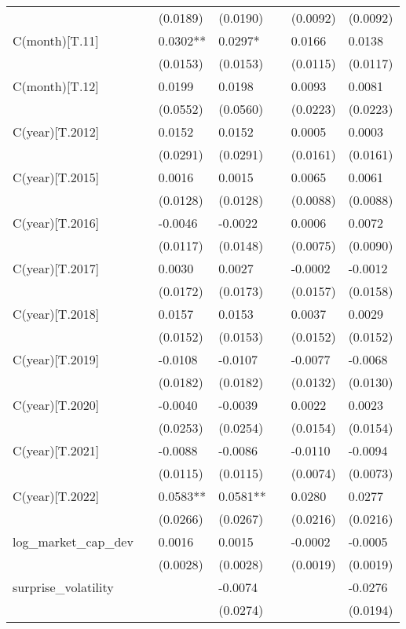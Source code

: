 \begin{tabular}{lllllll}
 &  & (0.0189) & (0.0190) &  & (0.0092) & (0.0092) \\
C(month)[T.11] &  & 0.0302** & 0.0297* &  & 0.0166 & 0.0138 \\
 &  & (0.0153) & (0.0153) &  & (0.0115) & (0.0117) \\
C(month)[T.12] &  & 0.0199 & 0.0198 &  & 0.0093 & 0.0081 \\
 &  & (0.0552) & (0.0560) &  & (0.0223) & (0.0223) \\
C(year)[T.2012] &  & 0.0152 & 0.0152 &  & 0.0005 & 0.0003 \\
 &  & (0.0291) & (0.0291) &  & (0.0161) & (0.0161) \\
C(year)[T.2015] &  & 0.0016 & 0.0015 &  & 0.0065 & 0.0061 \\
 &  & (0.0128) & (0.0128) &  & (0.0088) & (0.0088) \\
C(year)[T.2016] &  & -0.0046 & -0.0022 &  & 0.0006 & 0.0072 \\
 &  & (0.0117) & (0.0148) &  & (0.0075) & (0.0090) \\
C(year)[T.2017] &  & 0.0030 & 0.0027 &  & -0.0002 & -0.0012 \\
 &  & (0.0172) & (0.0173) &  & (0.0157) & (0.0158) \\
C(year)[T.2018] &  & 0.0157 & 0.0153 &  & 0.0037 & 0.0029 \\
 &  & (0.0152) & (0.0153) &  & (0.0152) & (0.0152) \\
C(year)[T.2019] &  & -0.0108 & -0.0107 &  & -0.0077 & -0.0068 \\
 &  & (0.0182) & (0.0182) &  & (0.0132) & (0.0130) \\
C(year)[T.2020] &  & -0.0040 & -0.0039 &  & 0.0022 & 0.0023 \\
 &  & (0.0253) & (0.0254) &  & (0.0154) & (0.0154) \\
C(year)[T.2021] &  & -0.0088 & -0.0086 &  & -0.0110 & -0.0094 \\
 &  & (0.0115) & (0.0115) &  & (0.0074) & (0.0073) \\
C(year)[T.2022] &  & 0.0583** & 0.0581** &  & 0.0280 & 0.0277 \\
 &  & (0.0266) & (0.0267) &  & (0.0216) & (0.0216) \\
log_market_cap_dev &  & 0.0016 & 0.0015 &  & -0.0002 & -0.0005 \\
 &  & (0.0028) & (0.0028) &  & (0.0019) & (0.0019) \\
surprise_volatility &  &  & -0.0074 &  &  & -0.0276 \\
 &  &  & (0.0274) &  &  & (0.0194) \\

\end{tabular}
